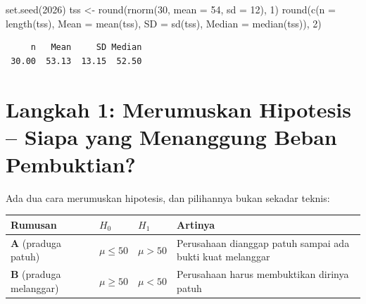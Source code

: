 \documentclass[
  indonesian,
  letterpaper,
]{book}
\newenvironment{Shaded}{\begin{snugshade}}{\end{snugshade}}
\newcommand{\AttributeTok}[1]{\textcolor[rgb]{0.40,0.45,0.13}{#1}}
\newcommand{\DecValTok}[1]{\textcolor[rgb]{0.68,0.00,0.00}{#1}}
\newcommand{\FunctionTok}[1]{\textcolor[rgb]{0.28,0.35,0.67}{#1}}
\newcommand{\NormalTok}[1]{\textcolor[rgb]{0.00,0.23,0.31}{#1}}
\newcommand{\OtherTok}[1]{\textcolor[rgb]{0.00,0.23,0.31}{#1}}
\newcounter{none} %
\begin{document}
\begin{Shaded}
\begin{Highlighting}[]
\FunctionTok{set.seed}\NormalTok{(}\DecValTok{2026}\NormalTok{)}
\NormalTok{tss }\OtherTok{\textless{}{-}} \FunctionTok{round}\NormalTok{(}\FunctionTok{rnorm}\NormalTok{(}\DecValTok{30}\NormalTok{, }\AttributeTok{mean =} \DecValTok{54}\NormalTok{, }\AttributeTok{sd =} \DecValTok{12}\NormalTok{), }\DecValTok{1}\NormalTok{)}
\FunctionTok{round}\NormalTok{(}\FunctionTok{c}\NormalTok{(}\AttributeTok{n =} \FunctionTok{length}\NormalTok{(tss), }\AttributeTok{Mean =} \FunctionTok{mean}\NormalTok{(tss), }\AttributeTok{SD =} \FunctionTok{sd}\NormalTok{(tss), }\AttributeTok{Median =} \FunctionTok{median}\NormalTok{(tss)), }\DecValTok{2}\NormalTok{)}
\end{Highlighting}
\end{Shaded}

\begin{verbatim}
     n   Mean     SD Median 
 30.00  53.13  13.15  52.50 
\end{verbatim}

\section{Langkah 1: Merumuskan Hipotesis -- Siapa yang Menanggung Beban
Pembuktian?}\label{langkah-1-merumuskan-hipotesis-siapa-yang-menanggung-beban-pembuktian}

Ada dua cara merumuskan hipotesis, dan pilihannya bukan sekadar teknis:

{\def\LTcaptype{none} %
\begin{longtable}[]{@{}
  >{\raggedright\arraybackslash}p{}
  >{\centering\arraybackslash}p{}
  >{\centering\arraybackslash}p{}
  >{\raggedright\arraybackslash}p{}@{}}
\toprule\noalign{}
\begin{minipage}[b]{\linewidth}\raggedright
Rumusan
\end{minipage} & \begin{minipage}[b]{\linewidth}\centering
\(H_0\)
\end{minipage} & \begin{minipage}[b]{\linewidth}\centering
\(H_1\)
\end{minipage} & \begin{minipage}[b]{\linewidth}\raggedright
Artinya
\end{minipage} \\
\midrule\noalign{}
\endhead
\bottomrule\noalign{}
\endlastfoot
\textbf{A} (praduga patuh) & \(\mu \leq 50\) & \(\mu > 50\) & Perusahaan
dianggap patuh sampai ada bukti kuat melanggar \\
\textbf{B} (praduga melanggar) & \(\mu \geq 50\) & \(\mu < 50\) &
Perusahaan harus membuktikan dirinya patuh \\
\end{longtable}
}
\end{document}

